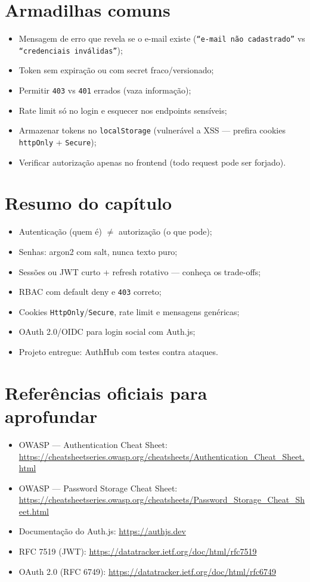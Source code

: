 \section{Armadilhas comuns}

\begin{itemize}[leftmargin=*, itemsep=0.4em]
  \item Mensagem de erro que revela se o e-mail existe (\texttt{``e-mail não cadastrado''} vs \texttt{``credenciais inválidas''});
  \item Token sem expiração ou com secret fraco/versionado;
  \item Permitir \texttt{403} vs \texttt{401} errados (vaza informação);
  \item Rate limit só no login e esquecer nos endpoints sensíveis;
  \item Armazenar tokens no \texttt{localStorage} (vulnerável a XSS — prefira cookies \texttt{httpOnly} + \texttt{Secure});
  \item Verificar autorização apenas no frontend (todo request pode ser forjado).
\end{itemize}

\section{Resumo do capítulo}

\begin{itemize}[leftmargin=*, itemsep=0.3em]
  \item Autenticação (quem é) $\neq$ autorização (o que pode);
  \item Senhas: argon2 com salt, nunca texto puro;
  \item Sessões ou JWT curto + refresh rotativo — conheça os trade-offs;
  \item RBAC com default deny e \texttt{403} correto;
  \item Cookies \texttt{HttpOnly}/\texttt{Secure}, rate limit e mensagens genéricas;
  \item OAuth 2.0/OIDC para login social com Auth.js;
  \item Projeto entregue: AuthHub com testes contra ataques.
\end{itemize}

\section{Referências oficiais para aprofundar}

\begin{itemize}[leftmargin=*, itemsep=0.3em]
  \item OWASP — Authentication Cheat Sheet: \url{https://cheatsheetseries.owasp.org/cheatsheets/Authentication_Cheat_Sheet.html}
  \item OWASP — Password Storage Cheat Sheet: \url{https://cheatsheetseries.owasp.org/cheatsheets/Password_Storage_Cheat_Sheet.html}
  \item Documentação do Auth.js: \url{https://authjs.dev}
  \item RFC 7519 (JWT): \url{https://datatracker.ietf.org/doc/html/rfc7519}
  \item OAuth 2.0 (RFC 6749): \url{https://datatracker.ietf.org/doc/html/rfc6749}
\end{itemize}
